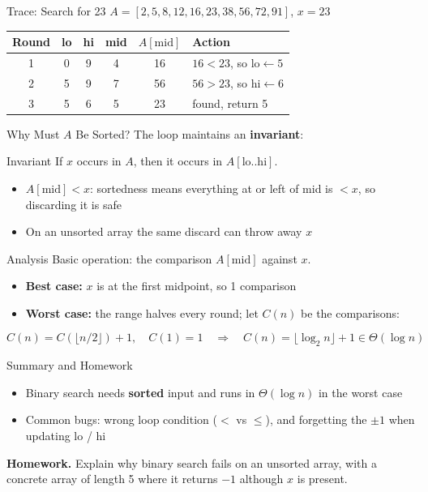 \documentclass[aspectratio=169,11pt]{beamer}
\begin{document}
\begin{frame}{Trace: Search for 23}
  $A = [2, 5, 8, 12, 16, 23, 38, 56, 72, 91]$, \quad $x = 23$
  \medskip
  \begin{center}
  \begin{tabular}{cccccl}
    \hline
    Round & lo & hi & mid & $A[\text{mid}]$ & Action \\
    \hline
    1 & 0 & 9 & 4 & 16 & $16 < 23$, so $\text{lo} \leftarrow 5$ \\
    2 & 5 & 9 & 7 & 56 & $56 > 23$, so $\text{hi} \leftarrow 6$ \\
    3 & 5 & 6 & 5 & 23 & found, return 5 \\
    \hline
  \end{tabular}
  \end{center}
\end{frame}

\begin{frame}{Why Must $A$ Be Sorted?}
  The loop maintains an \textbf{invariant}:
  \begin{block}{Invariant}
    If $x$ occurs in $A$, then it occurs in $A[\text{lo}..\text{hi}]$.
  \end{block}
  \begin{itemize}
    \item $A[\text{mid}] < x$: sortedness means everything at or left of mid is $< x$, so discarding it is safe
    \item On an unsorted array the same discard can throw away $x$
  \end{itemize}
\end{frame}

\begin{frame}{Analysis}
  Basic operation: the comparison $A[\text{mid}]$ against $x$.
  \medskip
  \begin{itemize}
    \item \textbf{Best case:} $x$ is at the first midpoint, so 1 comparison
    \item \textbf{Worst case:} the range halves every round; let $C(n)$ be the comparisons:
  \end{itemize}
  \[
    C(n) = C(\lfloor n/2 \rfloor) + 1, \quad C(1) = 1
    \quad\Longrightarrow\quad C(n) = \lfloor \log_2 n \rfloor + 1 \in \Theta(\log n)
  \]
\end{frame}

\begin{frame}{Summary and Homework}
  \begin{itemize}
    \item Binary search needs \textbf{sorted} input and runs in $\Theta(\log n)$ in the worst case
    \item Common bugs: wrong loop condition ($<$ vs $\le$), and forgetting the $\pm 1$ when updating lo / hi
  \end{itemize}
  \bigskip
  \textbf{Homework.} Explain why binary search fails on an unsorted array, with a
  concrete array of length 5 where it returns $-1$ although $x$ is present.
\end{frame}
\end{document}
